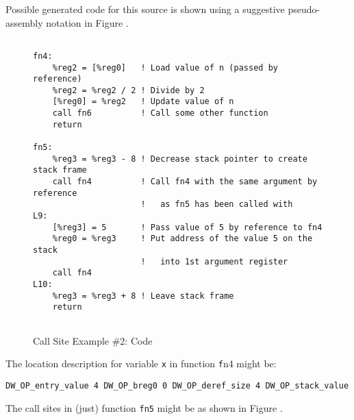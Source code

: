 Possible generated code for this source is shown using a suggestive 
pseudo-\linebreak[0]assembly notation in Figure .
\begin{figure}[h]
\begin{lstlisting}

fn4:
    %reg2 = [%reg0]   ! Load value of n (passed by reference)
    %reg2 = %reg2 / 2 ! Divide by 2
    [%reg0] = %reg2   ! Update value of n
    call fn6          ! Call some other function
    return

fn5:
    %reg3 = %reg3 - 8 ! Decrease stack pointer to create stack frame
    call fn4          ! Call fn4 with the same argument by reference 
                      !   as fn5 has been called with
L9:
    [%reg3] = 5       ! Pass value of 5 by reference to fn4
    %reg0 = %reg3     ! Put address of the value 5 on the stack
                      !   into 1st argument register
    call fn4
L10:
    %reg3 = %reg3 + 8 ! Leave stack frame
    return
    
\end{lstlisting}
\caption{Call Site Example \#2: Code}
\label{fig:callsiteexample2code}
\end{figure}

The location description for variable \texttt{x} in function 
\texttt{f}n4 might be:
\begin{lstlisting}
DW_OP_entry_value 4 DW_OP_breg0 0 DW_OP_deref_size 4 DW_OP_stack_value
\end{lstlisting}

The call sites in (just) function \texttt{fn5} might be as shown in 
Figure .

